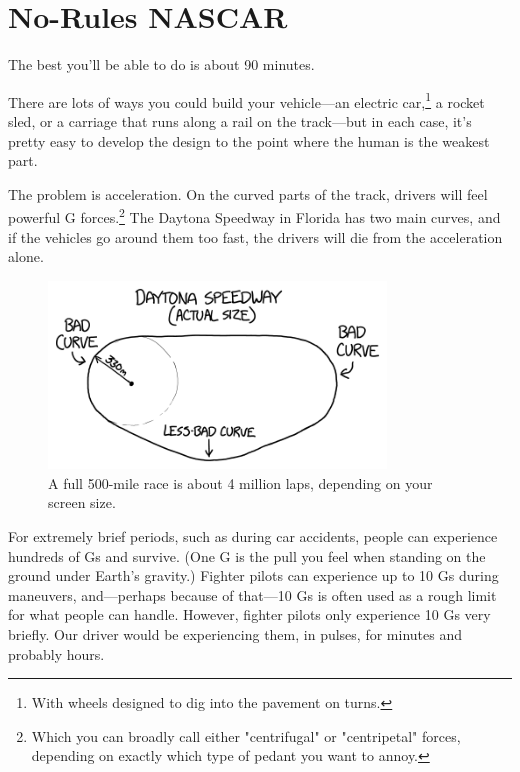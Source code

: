 {{
\chapter{No-Rules NASCAR}
}

\hfill{}

{The best you'll be able to do is about 90 minutes.}

{There are lots of ways you could build your vehicle—an electric car,{\footnote{With wheels designed to dig into the pavement on turns.} } a rocket sled, or a carriage that runs along a rail on the track—but in each case, it's pretty easy to develop the design to the point where the human is the weakest part.}

{The problem is acceleration. On the curved parts of the track, drivers will feel powerful G forces.{\footnote{Which you can broadly call either "centrifugal" or "centripetal" forces, depending on exactly which type of pedant you want to annoy.} } The Daytona Speedway in Florida has two main curves, and if the vehicles go around them too fast, the drivers will die from the acceleration alone.}

\begin{figure}[!htbp]
\centering
\includegraphics[scale=0.5, max width=0.8\textwidth]{imgs/a/116/daytona.png}
\caption{A full 500-mile race is about 4 million laps, depending on your screen size.}
\end{figure}

{For extremely brief periods, such as during car accidents, people can experience hundreds of Gs and survive. (One G is the pull you feel when standing on the ground under Earth's gravity.) Fighter pilots can experience up to 10 Gs during maneuvers, and—perhaps because of that—10 Gs is often used as a rough limit for what people can handle. However, fighter pilots only experience 10 Gs very briefly. Our driver would be experiencing them, in pulses, for minutes and probably hours.}

}
